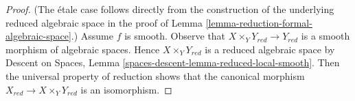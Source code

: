 \documentclass{stacks-project}
\theoremstyle{plain}
\theoremstyle{definition}
\theoremstyle{remark}
\numberwithin{equation}{subsection}
\begin{document}
\begin{proof}
(The \'etale case follows directly from the construction of
the underlying reduced algebraic space in the proof of
Lemma \ref{lemma-reduction-formal-algebraic-space}.)
Assume $f$ is smooth. Observe that $X \times_Y Y_{red} \to Y_{red}$
is a smooth morphism of algebraic spaces. Hence $X \times_Y Y_{red}$
is a reduced algebraic space by Descent on Spaces, Lemma
\ref{spaces-descent-lemma-reduced-local-smooth}.
Then the universal property of reduction shows that the canonical morphism
$X_{red} \to X \times_Y Y_{red}$ is an isomorphism.
\end{proof}
\end{document}
